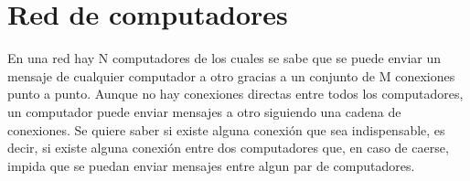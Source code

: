 \section{Red de computadores}
En una red hay N computadores de los cuales se sabe que se puede enviar un mensaje de cualquier computador a otro gracias a un conjunto de M conexiones punto a punto. Aunque no hay conexiones directas entre todos los computadores, un computador puede enviar mensajes a otro siguiendo una cadena de conexiones. Se quiere saber si existe alguna conexión que sea indispensable, es decir, si existe alguna conexión entre dos computadores que, en caso de caerse, impida que se puedan enviar mensajes entre algun par de computadores.
